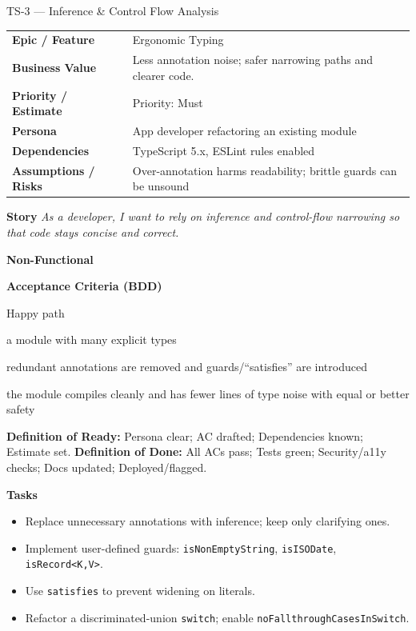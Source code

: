 \documentclass[11pt,a4paper]{article}
\newcommand{\Meta}[1]{\textcolor{Meta}{#1}}
\newcommand{\Small}[1]{{\footnotesize #1}}
\newcommand{\Tight}{\setlength{\itemsep}{2pt}\setlength{\topsep}{2pt}}
\newcommand{\key}[1]{\textbf{#1}}
\newcommand{\citem}{\item[$\square$]}
\newcommand{\badge}[1]{\pill{\footnotesize #1}}
\newcommand{\DoR}{\textbf{Definition of Ready:} Persona clear; AC drafted; Dependencies known; Estimate set.}
\newcommand{\DoD}{\textbf{Definition of Done:} All ACs pass; Tests green; Security/a11y checks; Docs updated; Deployed/flagged.}
\begin{document}
\clearpage

\begin{StoryCard}{TS-3 — Inference \& Control Flow Analysis}
\begin{tabularx}{\textwidth}{L Y}
  \key{Epic / Feature} & Ergonomic Typing\\
  \key{Business Value} & Less annotation noise; safer narrowing paths and clearer code.\\
  \key{Priority / Estimate} & Priority: Must \quad \badge{SP: 3}\\
  \key{Persona} & App developer refactoring an existing module\\
  \key{Dependencies} & TypeScript 5.x, ESLint rules enabled\\
  \key{Assumptions / Risks} & Over-annotation harms readability; brittle guards can be unsound\\
\end{tabularx}

\medskip
\key{Story}\; \emph{As a developer, I want to rely on inference and control-flow narrowing so that code stays concise and correct.}

\medskip
\key{Non-Functional}\; \badge{DX}\; \badge{Reliability}

\medskip
\key{Acceptance Criteria (BDD)}
\begin{description}[style=unboxed,leftmargin=0pt,labelsep=8pt]
  \item[\key{Scenario}] Happy path
  \item[\key{Given}] a module with many explicit types
  \item[\key{When}] redundant annotations are removed and guards/``satisfies'' are introduced
  \item[\key{Then}] the module compiles cleanly and has fewer lines of type noise with equal or better safety
\end{description}

\Small{\Meta{\DoR\;\; \textbullet\;\; \DoD}}

\medskip
\key{Tasks}
\begin{itemize}\Tight
  \citem Replace unnecessary annotations with inference; keep only clarifying ones.
  \citem Implement user-defined guards: \texttt{isNonEmptyString}, \texttt{isISODate}, \texttt{isRecord<K,V>}.
  \citem Use \texttt{satisfies} to prevent widening on literals.
  \citem Refactor a discriminated-union \texttt{switch}; enable \texttt{noFallthroughCasesInSwitch}.
\end{itemize}
\end{StoryCard}
\end{document}
